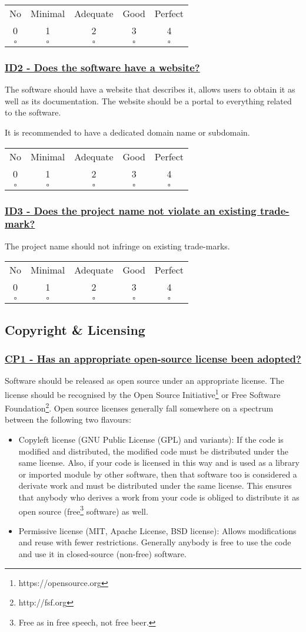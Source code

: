 \documentclass[a4paper,11pt]{article}
\newcommand{\criterion}[2]{\subsubsection*{\underline{#1 - #2}}\label{id:#1}}
\newcommand\CheckTable{%
  \begin{tabular}{ccccc}
    No & Minimal & Adequate & Good & Perfect \\
    0 & 1 & 2 & 3 & 4 \\
    \hline
    $\square$ & $\square$ & $\square$ & $\square$ & $\square$ \\
  \end{tabular}%
}
\begin{document}
\CheckTable

\newcommand{\idTwoID}{ID2}
\newcommand{\idTwoText}{Does the software have a website?}
\criterion{\idTwoID}{\idTwoText}

The software should have a website that describes it, allows users to obtain
it as well as its documentation. The website should be a portal to everything
related to the software.

It is recommended to have a dedicated domain name or subdomain.

\CheckTable

\newcommand{\idThreeID}{ID3}
\newcommand{\idThreeText}{Does the project name not violate an existing trade-mark?}
\criterion{\idThreeID}{\idThreeText}

The project name should not infringe on existing trade-marks.

\CheckTable

\subsection{Copyright \& Licensing}\label{sec:cop}

\newcommand{\cpOneID}{CP1}
\newcommand{\cpOneText}{Has an appropriate open-source license been adopted?}
\criterion{\cpOneID}{\cpOneText}

Software should be released as open source under an appropriate license. The
license should be recognised by the Open Source Initiative\footnote{https://opensource.org} or Free Software
Foundation\footnote{http://fsf.org}. Open source licenses generally fall somewhere on a spectrum between the following two flavours:

\begin{itemize}
 \item Copyleft license (GNU Public License (GPL) and variants): If the code is modified and distributed, the modified code must be distributed under the same license. Also, if your code is licensed in this way and is used as a library or imported module by other software, then that software too is considered a derivate work and must be distributed under the same license. This ensures that anybody who derives a work from your code is obliged to distribute it as open source (free\footnote{Free as in free speech, not free beer.} software) as well.
 \item Permissive license (MIT, Apache License, BSD license): Allows modifications and reuse with fewer restrictions. Generally anybody is free to use the code and use it in closed-source (non-free) software.
\end{itemize}
\end{document}
